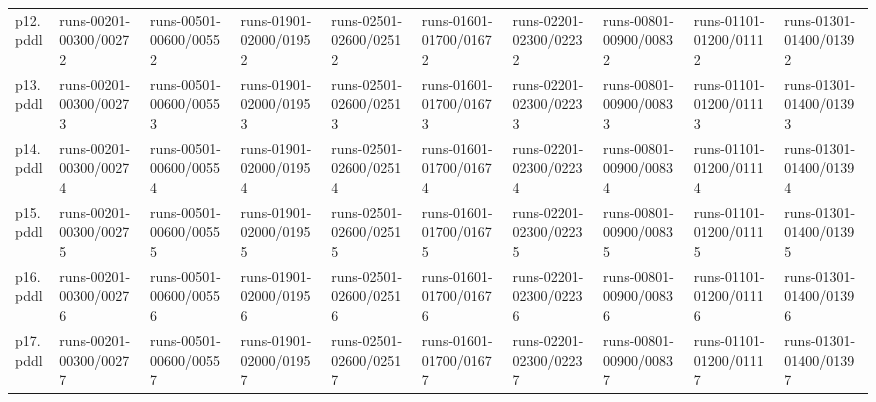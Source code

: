 \documentclass{article}
\begin{document}
\begin{tabular}{@{}lrrrrrrrrr@{}}
p12.pddl & \multicolumn{1}{|l|}{runs-00201-00300/00272} & \multicolumn{1}{|l|}{runs-00501-00600/00552} & \multicolumn{1}{|l|}{runs-01901-02000/01952} & \multicolumn{1}{|l|}{runs-02501-02600/02512} & \multicolumn{1}{|l|}{runs-01601-01700/01672} & \multicolumn{1}{|l|}{runs-02201-02300/02232} & \multicolumn{1}{|l|}{runs-00801-00900/00832} & \multicolumn{1}{|l|}{runs-01101-01200/01112} & \multicolumn{1}{|l|}{runs-01301-01400/01392} \\
p13.pddl & \multicolumn{1}{|l|}{runs-00201-00300/00273} & \multicolumn{1}{|l|}{runs-00501-00600/00553} & \multicolumn{1}{|l|}{runs-01901-02000/01953} & \multicolumn{1}{|l|}{runs-02501-02600/02513} & \multicolumn{1}{|l|}{runs-01601-01700/01673} & \multicolumn{1}{|l|}{runs-02201-02300/02233} & \multicolumn{1}{|l|}{runs-00801-00900/00833} & \multicolumn{1}{|l|}{runs-01101-01200/01113} & \multicolumn{1}{|l|}{runs-01301-01400/01393} \\
p14.pddl & \multicolumn{1}{|l|}{runs-00201-00300/00274} & \multicolumn{1}{|l|}{runs-00501-00600/00554} & \multicolumn{1}{|l|}{runs-01901-02000/01954} & \multicolumn{1}{|l|}{runs-02501-02600/02514} & \multicolumn{1}{|l|}{runs-01601-01700/01674} & \multicolumn{1}{|l|}{runs-02201-02300/02234} & \multicolumn{1}{|l|}{runs-00801-00900/00834} & \multicolumn{1}{|l|}{runs-01101-01200/01114} & \multicolumn{1}{|l|}{runs-01301-01400/01394} \\
p15.pddl & \multicolumn{1}{|l|}{runs-00201-00300/00275} & \multicolumn{1}{|l|}{runs-00501-00600/00555} & \multicolumn{1}{|l|}{runs-01901-02000/01955} & \multicolumn{1}{|l|}{runs-02501-02600/02515} & \multicolumn{1}{|l|}{runs-01601-01700/01675} & \multicolumn{1}{|l|}{runs-02201-02300/02235} & \multicolumn{1}{|l|}{runs-00801-00900/00835} & \multicolumn{1}{|l|}{runs-01101-01200/01115} & \multicolumn{1}{|l|}{runs-01301-01400/01395} \\
p16.pddl & \multicolumn{1}{|l|}{runs-00201-00300/00276} & \multicolumn{1}{|l|}{runs-00501-00600/00556} & \multicolumn{1}{|l|}{runs-01901-02000/01956} & \multicolumn{1}{|l|}{runs-02501-02600/02516} & \multicolumn{1}{|l|}{runs-01601-01700/01676} & \multicolumn{1}{|l|}{runs-02201-02300/02236} & \multicolumn{1}{|l|}{runs-00801-00900/00836} & \multicolumn{1}{|l|}{runs-01101-01200/01116} & \multicolumn{1}{|l|}{runs-01301-01400/01396} \\
p17.pddl & \multicolumn{1}{|l|}{runs-00201-00300/00277} & \multicolumn{1}{|l|}{runs-00501-00600/00557} & \multicolumn{1}{|l|}{runs-01901-02000/01957} & \multicolumn{1}{|l|}{runs-02501-02600/02517} & \multicolumn{1}{|l|}{runs-01601-01700/01677} & \multicolumn{1}{|l|}{runs-02201-02300/02237} & \multicolumn{1}{|l|}{runs-00801-00900/00837} & \multicolumn{1}{|l|}{runs-01101-01200/01117} & \multicolumn{1}{|l|}{runs-01301-01400/01397} \\

\end{tabular}
\end{document}
